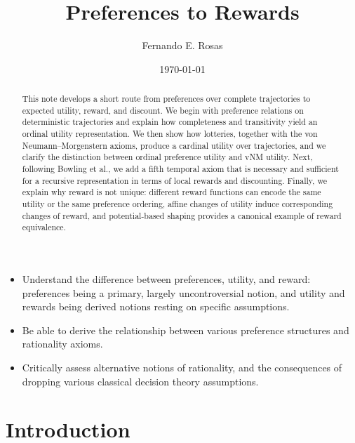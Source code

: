 \documentclass[11pt]{article}
\title{Preferences to Rewards}
\author{Fernando E. Rosas}
\date{\today}
\begin{document}
\maketitle

\begin{learningoutcomes}
  \begin{itemize}
    \item Understand the difference between preferences, utility, and reward:
      preferences being a primary, largely uncontroversial notion, and utility
      and rewards being derived notions resting on specific assumptions.
    \item Be able to derive the relationship between various preference
      structures and rationality axioms.
    \item Critically assess alternative notions of rationality, and the
      consequences of dropping various classical decision theory assumptions.
  \end{itemize}
\end{learningoutcomes}

\begin{abstract}
\noindent
This note develops a short route from preferences over complete trajectories to
expected utility, reward, and discount. We begin with preference relations on
deterministic trajectories and explain how completeness and transitivity yield
an ordinal utility representation. We then show how lotteries, together with
the von Neumann--Morgenstern axioms, produce a cardinal utility over
trajectories, and we clarify the distinction between ordinal preference utility
and vNM utility. Next, following Bowling et al., we add a fifth temporal axiom
that is necessary and sufficient for a recursive representation in terms of
local rewards and discounting. Finally, we explain why reward is not unique:
different reward functions can encode the same utility or the same preference
ordering, affine changes of utility induce corresponding changes of reward, and
potential-based shaping provides a canonical example of reward equivalence.
\end{abstract}

\section{Introduction}
\end{document}
